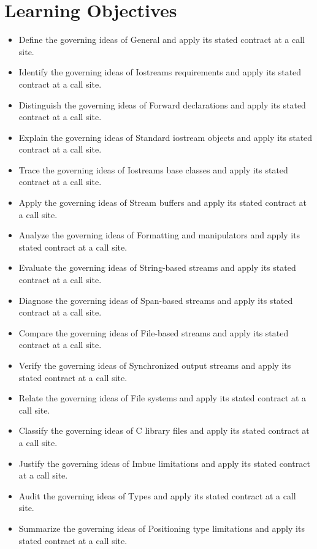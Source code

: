 \documentclass[11pt,letterpaper]{article}
\begin{document}
\section{Learning Objectives}
\begin{itemize}[label=\textcolor{CornellReferenceTeal}{$\blacktriangleright$}]
\item Define the governing ideas of General and apply its stated contract at a call site.
\item Identify the governing ideas of Iostreams requirements and apply its stated contract at a call site.
\item Distinguish the governing ideas of Forward declarations and apply its stated contract at a call site.
\item Explain the governing ideas of Standard iostream objects and apply its stated contract at a call site.
\item Trace the governing ideas of Iostreams base classes and apply its stated contract at a call site.
\item Apply the governing ideas of Stream buffers and apply its stated contract at a call site.
\item Analyze the governing ideas of Formatting and manipulators and apply its stated contract at a call site.
\item Evaluate the governing ideas of String-based streams and apply its stated contract at a call site.
\item Diagnose the governing ideas of Span-based streams and apply its stated contract at a call site.
\item Compare the governing ideas of File-based streams and apply its stated contract at a call site.
\item Verify the governing ideas of Synchronized output streams and apply its stated contract at a call site.
\item Relate the governing ideas of File systems and apply its stated contract at a call site.
\item Classify the governing ideas of C library files and apply its stated contract at a call site.
\item Justify the governing ideas of Imbue limitations and apply its stated contract at a call site.
\item Audit the governing ideas of Types and apply its stated contract at a call site.
\item Summarize the governing ideas of Positioning type limitations and apply its stated contract at a call site.
\end{itemize}
\end{document}
